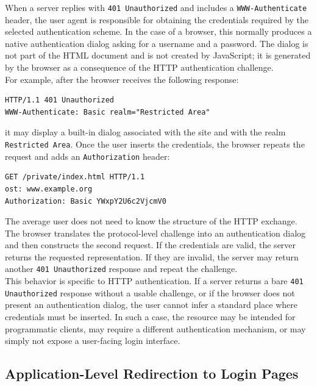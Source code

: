 \documentclass{scrbook}
\begin{document}
When a server replies with \texttt{401 Unauthorized} and includes a \texttt{WWW-Authenticate} header, the user agent is responsible for obtaining the credentials required by the selected authentication scheme. In the case of a browser, this normally produces a native authentication dialog asking for a username and a password. The dialog is not part of the HTML document and is not created by JavaScript; it is generated by the browser as a consequence of the HTTP authentication challenge.\\

For example, after the browser receives the following response:

\begin{lstlisting}
HTTP/1.1 401 Unauthorized
WWW-Authenticate: Basic realm="Restricted Area"
\end{lstlisting}

it may display a built-in dialog associated with the site and with the realm
\texttt{Restricted Area}. Once the user inserts the credentials, the browser
repeats the request and adds an \texttt{Authorization} header:

\begin{lstlisting}
GET /private/index.html HTTP/1.1
ost: www.example.org
Authorization: Basic YWxpY2U6c2VjcmV0
\end{lstlisting}

The average user does not need to know the structure of the HTTP exchange. The browser translates the protocol-level challenge into an authentication dialog and then constructs the second request. If the credentials are valid, the server returns the requested representation. If they are invalid, the server may return another \texttt{401 Unauthorized} response and repeat the challenge.\\

This behavior is specific to HTTP authentication. If a server returns a bare \texttt{401 Unauthorized} response without a usable challenge, or if the browser does not present an authentication dialog, the user cannot infer a standard place where credentials must be inserted. In such a case, the resource may be intended for programmatic clients, may require a different authentication mechanism, or may simply not expose a user-facing login interface.

\subsection{Application-Level Redirection to Login Pages}
\end{document}
